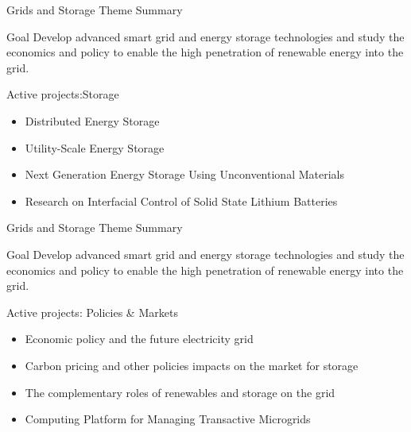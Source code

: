 \documentclass{beamer}
\renewcommand{\(}{\begin{columns}}
\renewcommand{\)}{\end{columns}}
\newcommand{\<}[1]{\begin{column}{#1}}
\renewcommand{\>}{\end{column}}
\begin{document}
\begin{frame}[t]{Grids and Storage Theme Summary}
\begin{block}{Goal} Develop advanced smart grid and energy storage technologies and study the economics and policy to enable the high penetration of renewable energy into the grid.
\end{block}
\begin{block}{Active projects:Storage}
\begin{itemize}\setlength\itemsep{.01em}
\item Distributed Energy Storage
\item Utility-Scale Energy Storage
\item Next Generation Energy Storage Using Unconventional Materials
\item Research on Interfacial Control of Solid State Lithium Batteries
\end{itemize}

\end{block}
\end{frame}

\begin{frame}[t]{Grids and Storage Theme Summary}
\begin{block}{Goal} Develop advanced smart grid and energy storage technologies and study the economics and policy to enable the high penetration of renewable energy into the grid.
\end{block}
\begin{block}{Active projects: Policies \& Markets}
\begin{itemize}\setlength\itemsep{.01em}
\item Economic policy and the future electricity grid
\item Carbon pricing and other policies impacts on the market for storage
\item The complementary roles of renewables and storage on the grid
\item Computing Platform for Managing Transactive Microgrids
\end{itemize}
\end{block}
\end{frame}
\end{document}
